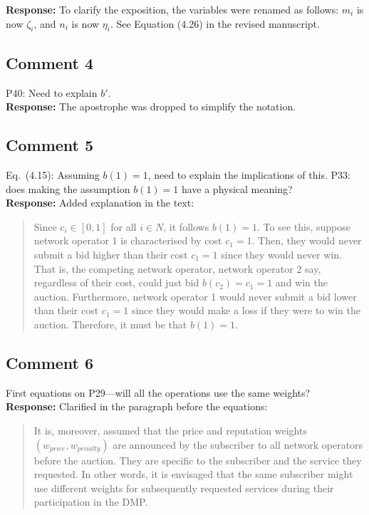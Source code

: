 \documentclass[10pt,a4paper,notitlepage]{article}
\numberwithin{equation}{section}
\begin{document}
\textbf{Response:}
To clarify the exposition, the variables were renamed as follows: $m_i$ is now $\zeta_i$, and $n_i$ is now $\eta_i$. See Equation (4.26) in the revised manuscript.

\subsection{Comment 4}
P40: Need to explain $b'$.\\[-2ex]

\textbf{Response:}
The apostrophe was dropped to simplify the notation.

\subsection{Comment 5}
Eq.~(4.15): Assuming $b(1) = 1$, need to explain the implications of this. P33: does making the assumption $b(1)=1$ have a physical meaning?\\[-2ex]

\textbf{Response:}
Added explanation in the text:
\begin{quote}
Since $c_i\in [0,1]$ for all $i\in N$, it follows $b(1) = 1$. To see this, suppose network operator 1 is characterised by cost $c_1 = 1$. Then, they would never submit a bid higher than their cost $c_1 = 1$ since they would never win. That is, the competing network operator, network operator 2 say, regardless of their cost, could just bid $b(c_2) = c_1 = 1$ and win the auction. Furthermore, network operator 1 would never submit a bid lower than their cost $c_1 = 1$ since they would make a loss if they were to win the auction. Therefore, it must be that $b(1) = 1$.
\end{quote}

\subsection{Comment 6}
First equations on P29---will all the operations use the same weights?\\[-2ex]

\textbf{Response:}
Clarified in the paragraph before the equations:
\begin{quote}
It is, moreover, assumed that the price and reputation weights $(w_{price}, w_{penalty})$ are announced by the subscriber to all network operators before the auction. They are specific to the subscriber and the service they requested. In other words, it is envisaged that the same subscriber might use different weights for subsequently requested services during their participation in the DMP.
\end{quote}
\end{document}
